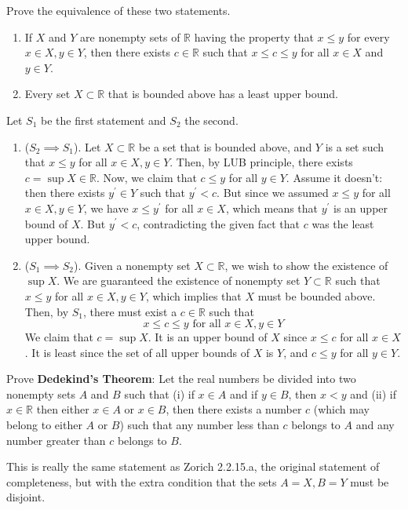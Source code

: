   \begin{exercise}[Zorich 2.2.15]
    Prove the equivalence of these two statements. 
    \begin{enumerate}
      \item If $X$ and $Y$ are nonempty sets of $\mathbb{R}$ having the property that $x \leq y$ for every $x \in X, y \in Y$, then there exists $c \in \mathbb{R}$ such that $x \leq c \leq y$ for all $x \in X$ and $y \in Y$. 
      \item Every set $X \subset \mathbb{R}$ that is bounded above has a least upper bound. 
    \end{enumerate}
  \end{exercise}
  \begin{solution}
    Let $S_1$ be the first statement and $S_2$ the second. 
    \begin{enumerate}
      \item ($S_2 \implies S_1$). Let $X \subset \mathbb{R}$ be a set that is bounded above, and $Y$ is a set such that $x \leq y$ for all $x \in X, y \in Y$. Then, by LUB principle, there exists $c = \sup{X} \in \mathbb{R}$. Now, we claim that $c \leq y$ for all $y \in Y$. Assume it doesn't: then there exists $y^\prime \in Y$ such that $y^\prime < c$. But since we assumed $x \leq y$ for all $x \in X, y \in Y$, we have $x \leq y^\prime$ for all $x \in X$, which means that $y^\prime$ is an upper bound of $X$. But $y^\prime < c$, contradicting the given fact that $c$ was the least upper bound. 

      \item ($S_1 \implies S_2$). Given a nonempty set $X \subset \mathbb{R}$, we wish to show the existence of $\sup{X}$. We are guaranteed the existence of nonempty set $Y \subset \mathbb{R}$ such that $x \leq y$ for all $x \in X, y \in Y$, which implies that $X$ must be bounded above. Then, by $S_1$, there must exist a $c \in \mathbb{R}$ such that 
      \begin{equation}
        x \leq c \leq y \text{ for all } x \in X, y \in Y
      \end{equation}
      We claim that $c = \sup{X}$. It is an upper bound of $X$ since $x \leq c$ for all $x \in X$. It is least since the set of all upper bounds of $X$ is $Y$, and $c \leq y$ for all $y \in Y$. 
    \end{enumerate}
  \end{solution}

  \begin{exercise}[Olmsted 1.15]
    Prove \textbf{Dedekind's Theorem}: Let the real numbers be divided into two nonempty sets $A$ and $B$ such that (i) if $x \in A$ and if $y \in B$, then $x < y$ and (ii) if $x \in \mathbb{R}$ then either $x \in A$ or $x \in B$, then there exists a number $c$ (which may belong to either $A$ or $B$) such that any number less than $c$ belongs to $A$ and any number greater than $c$ belongs to $B$. 
  \end{exercise}
  \begin{solution}
    This is really the same statement as Zorich 2.2.15.a, the original statement of completeness, but with the extra condition that the sets $A = X, B = Y$ must be disjoint.
  \end{solution}

